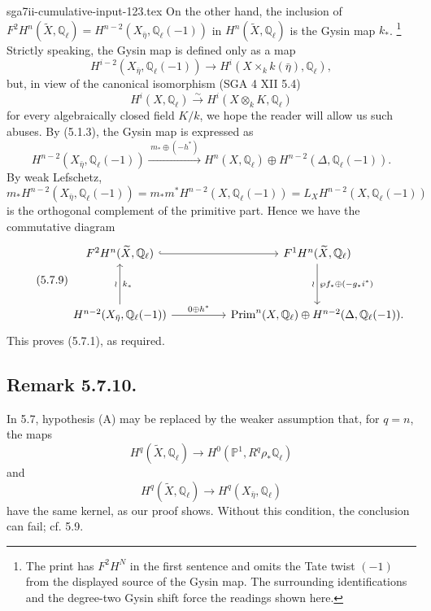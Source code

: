 \begin{filecontents*}{sga7ii-cumulative-input-123.tex}
On the other hand, the inclusion of
$F^2H^n(\widetilde X,\mathbb Q_\ell)
=H^{n-2}(X_{\bar\eta},\mathbb Q_\ell(-1))$
in $H^n(\widetilde X,\mathbb Q_\ell)$ is the Gysin map $k_*$.
\footnote{The print has $F^2H^N$ in the first sentence and omits the
Tate twist $(-1)$ from the displayed source of the Gysin map.  The
surrounding identifications and the degree-two Gysin shift force the readings
shown here.}
Strictly speaking, the Gysin map is defined only as a map
\[
H^{i-2}(X_{\bar\eta},\mathbb Q_\ell(-1))
\longrightarrow
H^i(X\times_k k(\bar\eta),\mathbb Q_\ell),
\]
but, in view of the canonical isomorphism (SGA 4 XII 5.4)
\[
H^i(X,\mathbb Q_\ell)\xrightarrow{\sim}
H^i(X\otimes_kK,\mathbb Q_\ell)
\]
for every algebraically closed field $K/k$, we hope the reader will allow
us such abuses.
By (5.1.3), the Gysin map is expressed as
\begin{equation}\tag{5.7.8}
H^{n-2}(X_{\bar\eta},\mathbb Q_\ell(-1))
\xrightarrow{\;m_*\oplus(-h^*)\;}
H^n(X,\mathbb Q_\ell)
\oplus H^{n-2}(\Delta,\mathbb Q_\ell(-1)).
\end{equation}
By weak Lefschetz,
\[
m_*H^{n-2}(X_{\bar\eta},\mathbb Q_\ell(-1))
=m_*m^*H^{n-2}(X,\mathbb Q_\ell(-1))
=L_XH^{n-2}(X,\mathbb Q_\ell(-1))
\]
is the orthogonal complement of the primitive part.  Hence we have the
commutative diagram
\begin{equation}\tag{5.7.9}
\begin{tikzcd}[column sep=huge,row sep=huge]
F^2H^n(\widetilde X,\mathbb Q_\ell)
  \arrow[r,hook]
& F^1H^n(\widetilde X,\mathbb Q_\ell)
  \arrow[d,"\wp f_*\oplus(-g_*i^*)","\wr"']
\\
H^{n-2}(X_{\bar\eta},\mathbb Q_\ell(-1))
  \arrow[u,"k_*"',"\wr"]
  \arrow[r,"0\oplus h^*"]
& \operatorname{Prim}^n(X,\mathbb Q_\ell)
  \oplus H^{n-2}(\Delta,\mathbb Q_\ell(-1)).
\end{tikzcd}
\end{equation}
This proves (5.7.1), as required.

\subsection*{Remark 5.7.10.}
In 5.7, hypothesis (A) may be replaced by the weaker assumption that, for
$q=n$, the maps
\begin{equation}\tag{5.7.11}
H^q(\widetilde X,\mathbb Q_\ell)\longrightarrow
H^0(\mathbb P^1,R^q\rho_*\mathbb Q_\ell)
\end{equation}
and
\begin{equation}\tag{5.7.12}
H^q(\widetilde X,\mathbb Q_\ell)\longrightarrow
H^q(X_{\bar\eta},\mathbb Q_\ell)
\end{equation}
have the same kernel, as our proof shows.  Without this condition, the
conclusion can fail; cf. 5.9.
\end{filecontents*}
